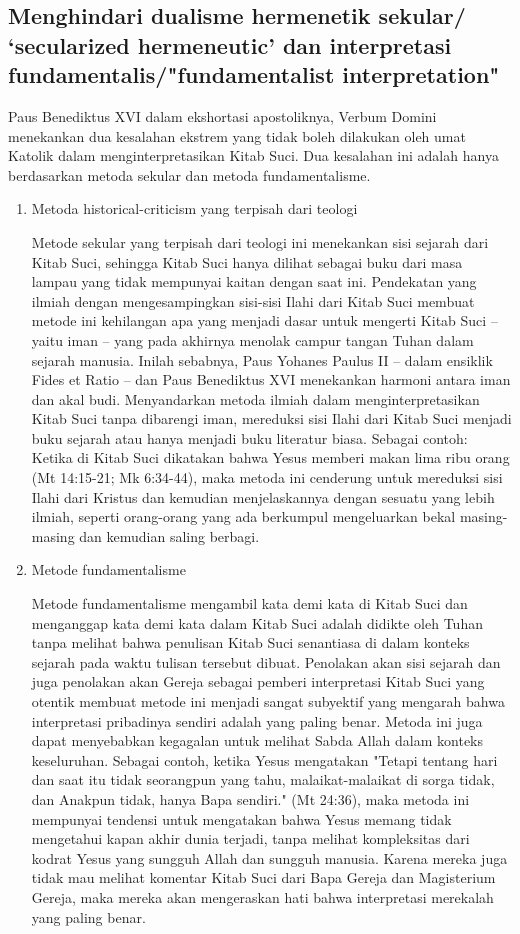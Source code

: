 \subsection{Menghindari dualisme hermenetik sekular/ ‘secularized hermeneutic’ dan interpretasi fundamentalis/"fundamentalist interpretation"}
Paus Benediktus XVI dalam ekshortasi apostoliknya, Verbum Domini menekankan dua kesalahan ekstrem yang tidak boleh dilakukan oleh umat Katolik dalam menginterpretasikan Kitab Suci. Dua kesalahan ini adalah hanya berdasarkan metoda sekular dan metoda fundamentalisme.
\begin{enumerate}
\item Metoda historical-criticism yang terpisah dari teologi

Metode sekular yang terpisah dari teologi ini menekankan sisi sejarah dari Kitab Suci, sehingga Kitab Suci hanya dilihat sebagai buku dari masa lampau yang tidak mempunyai kaitan dengan saat ini. Pendekatan yang ilmiah dengan mengesampingkan sisi-sisi Ilahi dari Kitab Suci membuat metode ini kehilangan apa yang menjadi dasar untuk mengerti Kitab Suci – yaitu iman – yang pada akhirnya menolak campur tangan Tuhan dalam sejarah manusia. Inilah sebabnya, Paus Yohanes Paulus II – dalam ensiklik Fides et Ratio – dan Paus Benediktus XVI menekankan harmoni antara iman dan akal budi. Menyandarkan metoda ilmiah dalam menginterpretasikan Kitab Suci tanpa dibarengi iman, mereduksi sisi Ilahi dari Kitab Suci menjadi buku sejarah atau hanya menjadi buku literatur biasa. Sebagai contoh: Ketika di Kitab Suci dikatakan bahwa Yesus memberi makan lima ribu orang (Mt 14:15-21; Mk 6:34-44), maka metoda ini cenderung untuk mereduksi sisi Ilahi dari Kristus dan kemudian menjelaskannya dengan sesuatu yang lebih ilmiah, seperti orang-orang yang ada berkumpul mengeluarkan bekal masing-masing dan kemudian saling berbagi.

\item Metode fundamentalisme

Metode fundamentalisme mengambil kata demi kata di Kitab Suci dan menganggap kata demi kata dalam Kitab Suci adalah didikte oleh Tuhan tanpa melihat bahwa penulisan Kitab Suci senantiasa di dalam konteks sejarah pada waktu tulisan tersebut dibuat. Penolakan akan sisi sejarah dan juga penolakan akan Gereja sebagai pemberi interpretasi Kitab Suci yang otentik membuat metode ini menjadi sangat subyektif yang mengarah bahwa interpretasi pribadinya sendiri adalah yang paling benar. Metoda ini juga dapat menyebabkan kegagalan untuk melihat Sabda Allah dalam konteks keseluruhan. Sebagai contoh, ketika Yesus mengatakan "Tetapi tentang hari dan saat itu tidak seorangpun yang tahu, malaikat-malaikat di sorga tidak, dan Anakpun tidak, hanya Bapa sendiri." (Mt 24:36), maka metoda ini mempunyai tendensi untuk mengatakan bahwa Yesus memang tidak mengetahui kapan akhir dunia terjadi, tanpa melihat kompleksitas dari kodrat Yesus yang sungguh Allah dan sungguh manusia. Karena mereka juga tidak mau melihat komentar Kitab Suci dari Bapa Gereja dan Magisterium Gereja, maka mereka akan mengeraskan hati bahwa interpretasi merekalah yang paling benar.
\end{enumerate}

